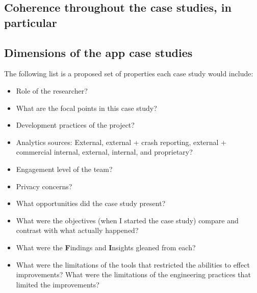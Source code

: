\subsection{Coherence throughout the case studies, in particular}


\subsection{Dimensions of the app case studies}
The following list is a proposed set of properties each case study would include:
{\small
\begin{itemize}
    \itemsep0em
    \item Role of the researcher?
    \item What are the focal points in this case study?
    \item Development practices of the project?
    \item Analytics sources: External, external + crash reporting, external + commercial internal, external, internal, and proprietary?
    \item Engagement level of the team?
    \item Privacy concerns?
    \item What opportunities did the case study present?
    \item What were the objectives (when I started the case study) compare and contrast with what actually happened? 
    \item What were the \textbf{F}indings and \textbf{I}nsights gleaned from each?
    \item What were the limitations of the tools that restricted the abilities to effect improvements? What were the limitations of the engineering practices that limited the improvements?
\end{itemize}
}

\newcommand{\head}[2]{\multicolumn{1}{>{\centering\arraybackslash}p{#1}}{\textbf{#2}}}  %

